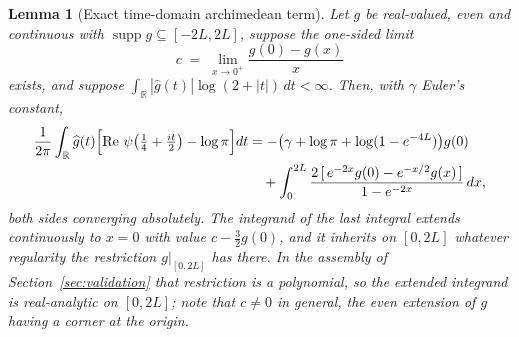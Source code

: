 ﻿\documentclass[11pt]{article}
\newtheorem{lemma}[theorem]{Lemma}
\newcommand{\R}{\mathbb{R}}
\newcommand{\supp}{\operatorname{supp}}
\newcommand{\Rey}{\operatorname{Re}}
\begin{document}
\begin{lemma}[Exact time-domain archimedean term]\label{lem:arch}
Let $g$ be real-valued, even and continuous with
$\supp g\subseteq[-2L,2L]$, suppose the one-sided limit
\begin{equation}\label{eq:archcorner}
  c\;=\;\lim_{x\to0^+}\frac{g(0)-g(x)}{x}
\end{equation}
exists, and suppose
$\int_{\R}|\widehat g(t)|\log(2+|t|)\,dt<\infty$.  Then, with $\gamma$
Euler's constant,
\begin{align*}
\frac1{2\pi}\int_{\R}\widehat g(t)\Bigl[\Rey\,\psi\bigl(\tfrac14
+\tfrac{it}2\bigr)-\log\pi\Bigr]dt
&=-\bigl(\gamma+\log\pi+\log(1-e^{-4L})\bigr)g(0)\\
&\quad+\int_0^{2L}
\frac{2\,[\,e^{-2x}g(0)-e^{-x/2}g(x)\,]}{1-e^{-2x}}\,dx ,
\end{align*}
both sides converging absolutely.  The integrand of the last integral
extends continuously to $x=0$ with value $c-\tfrac32g(0)$, and it
inherits on $[0,2L]$ whatever regularity the restriction
$g|_{[0,2L]}$ has there.  In the assembly of
Section~\ref{sec:validation} that restriction is a polynomial, so the
extended integrand is real-analytic on $[0,2L]$; note that $c\ne0$ in
general, the even extension of $g$ having a corner at the origin.
\end{lemma}
\end{document}
